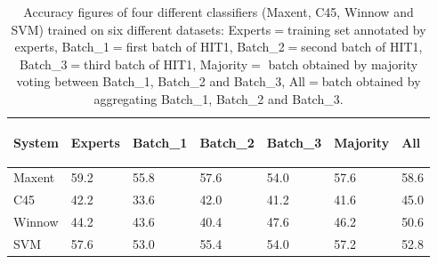 \documentclass[11pt,letterpaper]{article}
\begin{document}
\begin{table}
\begin{table}
\begin{center}
\begin{small}
\begin{tabular}{|l|l|l|l|l|l|l|} \hline
 System & 
 {\begin{sideways}\parbox{2cm}{\centering Experts}\end{sideways}} &
 {\begin{sideways}\parbox{2cm}{\centering Batch\_1}\end{sideways}} &
 {\begin{sideways}\parbox{2cm}{\centering Batch\_2}\end{sideways}} &
 {\begin{sideways}\parbox{2cm}{\centering Batch\_3}\end{sideways}} &
 {\begin{sideways}\parbox{2cm}{\centering Majority}\end{sideways}} &
 {\begin{sideways}\parbox{2cm}{\centering All}\end{sideways}} \\ \hline
 Maxent & 59.2 & 55.8 & 57.6 & 54.0 & 57.6 & 58.6 \\ \hline
 C45 & 42.2 & 33.6 & 42.0 & 41.2 & 41.6 & 45.0 \\ \hline
 Winnow & 44.2 & 43.6 & 40.4 & 47.6 & 46.2 & 50.6 \\ \hline
 SVM & 57.6 & 53.0 & 55.4 & 54.0 & 57.2 & 52.8 \\ \hline
\end{tabular}
\end{small}
\end{center}
\caption{Accuracy figures of four different classifiers (Maxent, C45, Winnow and SVM) trained on six different datasets: Experts$=$training set annotated by experts, Batch\_1$=$first batch of HIT1, Batch\_2$=$second batch of HIT1, Batch\_3$=$third batch of HIT1, Majority$=$ batch obtained by majority voting between Batch\_1, Batch\_2 and Batch\_3, All$=$batch obtained by aggregating Batch\_1, Batch\_2 and Batch\_3.}
\label{table:amtvsexp}
\end{table}



\end{table}
\end{document}

